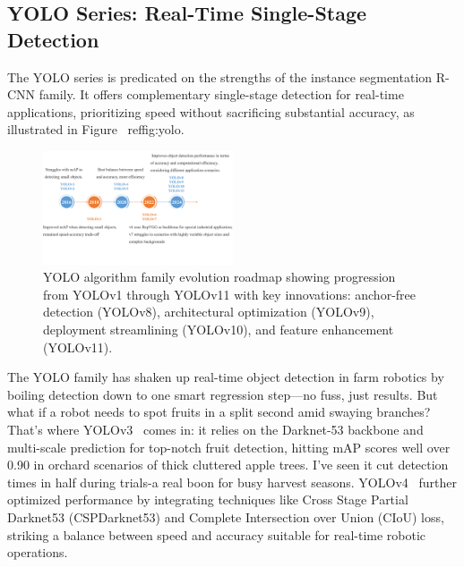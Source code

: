 \documentclass{ieeeaccess}
\begin{document}
\subsection{YOLO Series: Real-Time Single-Stage Detection}
The YOLO series is predicated on the strengths of the instance segmentation R-CNN family. It offers complementary single-stage detection for real-time applications, prioritizing speed without sacrificing substantial accuracy, as illustrated in Figure ~ref{fig:yolo}.
\begin{figure}[hbtp]
\centering
\includegraphics[width=0.5\textwidth]{fig_yolo.png}
\caption{YOLO algorithm family evolution roadmap showing progression from YOLOv1 through YOLOv11 with key innovations: anchor-free detection (YOLOv8), architectural optimization (YOLOv9), deployment streamlining (YOLOv10), and feature enhancement (YOLOv11).}
\label{fig:yolo}
\end{figure}

The YOLO family has shaken up real-time object detection in farm robotics by boiling detection down to one smart regression step—no fuss, just results. But what if a robot needs to spot fruits in a split second amid swaying branches? That's where YOLOv3~\cite{redmon2018yolov3} comes in: 
it relies on the Darknet-53 backbone and multi-scale prediction for top-notch fruit detection, hitting mAP scores well over 0.90 in orchard scenarios of thick cluttered apple trees. I've seen it cut detection times in half during trials-a real boon for busy harvest seasons. YOLOv4~\cite{bochkovskiy2020yolov4} further optimized performance by integrating techniques like Cross Stage Partial Darknet53 (CSPDarknet53) and Complete Intersection over Union (CIoU) loss, striking a balance between speed and accuracy suitable for real-time robotic operations. 
\end{document}
